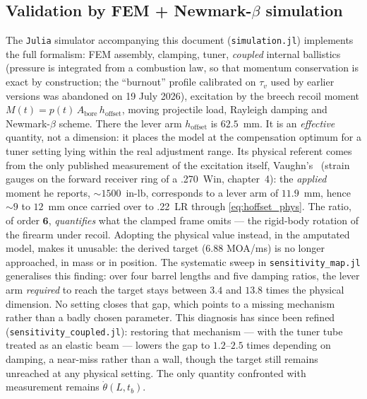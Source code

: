 \documentclass[12pt,a4paper]{article}
\begin{document}
	\subsection{Validation by FEM + Newmark-$\beta$ simulation}
	\label{sec:validation_num}

	The \texttt{Julia} simulator accompanying this document (\texttt{simulation.jl}) implements the full formalism: FEM assembly, clamping, tuner, \emph{coupled} internal ballistics (pressure is integrated from a combustion law, so that momentum conservation is exact by construction; the ``burnout'' profile calibrated on $\tau_v$ used by earlier versions was abandoned on 19 July 2026), excitation by the breech recoil moment $M(t) = p(t)\,A_\text{bore}\,h_\text{offset}$, moving projectile load, Rayleigh damping and Newmark-$\beta$ scheme. There the lever arm $h_\text{offset}$ is $62.5$~mm. It is an \emph{effective} quantity, not a dimension: it places the model at the compensation optimum for a tuner setting lying within the real adjustment range. Its physical referent comes from the only published measurement of the excitation itself, Vaughn's~\cite{Vaughn} (strain gauges on the forward receiver ring of a .270~Win, chapter~4): the \emph{applied} moment he reports, $\sim 1500$~in-lb, corresponds to a lever arm of $11.9$~mm, hence $\sim 9$ to $12$~mm once carried over to .22~LR through \eqref{eq:hoffset_phys}. The ratio, of order $\mathbf{6}$, \emph{quantifies} what the clamped frame omits --- the rigid-body rotation of the firearm under recoil. Adopting the physical value instead, in the amputated model, makes it unusable: the derived target ($6.88$ MOA/ms) is no longer approached, in mass or in position. The systematic sweep in \texttt{sensitivity\_map.jl} generalises this finding: over four barrel lengths and five damping ratios, the lever arm \emph{required} to reach the target stays between $3.4$ and $13.8$ times the physical dimension. No setting closes that gap, which points to a missing mechanism rather than a badly chosen parameter. This diagnosis has since been refined (\texttt{sensitivity\_coupled.jl}): restoring that mechanism --- with the tuner tube treated as an elastic beam --- lowers the gap to $1.2$--$2.5$ times depending on damping, a near-miss rather than a wall, though the target still remains unreached at any physical setting. The only quantity confronted with measurement remains $\dot\theta(L,t_b)$.
\end{document}
